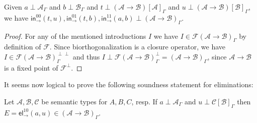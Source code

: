 \documentclass[a4paper,USenglish,cleveref, autoref, thm-restate]{lipics-v2021}
\newenvironment{caselist}{%
  \begin{list}{{\it Case}}{%
  }%
}{\end{list}%
}
\newcommand{\nextcase}{\item~}
\newcommand{\tin}{\ensuremath{\mathsf{in}}}
\newcommand{\inn}[2]{\ensuremath{\tin_{#1}^{#2}}}
\newcommand{\tel}{\mathsf{el}}
\newcommand{\el}[2]{\ensuremath{\tel_{#1}^{#2}}}
\newcommand{\contract}[1][]{\mapsto_{#1}}
\newcommand{\A}{\mathcal{A}}
\newcommand{\B}{\mathcal{B}}
\newcommand{\C}{\mathcal{C}}
\newcommand{\F}{\mathcal{F}}
\newcommand{\SN}{\mathsf{SN}}
\begin{document}
\begin{lemma}
  \label{lem:funintro}
  Given
  $a \perp \A_\Gamma$ and
  $b \perp \B_\Gamma$ and
  $t \perp (\A \to \B)[\A]_\Gamma$ and
  $u \perp (\A \to \B)[\B]_\Gamma$,
  we have
    $\inn\to{00}(t,u),
     \inn\to{01}(t,b),
     \inn\to{11}(a,b) \perp (\A \to \B)_\Gamma$.
\end{lemma}
\begin{proof}
  For any of the mentioned introductions $I$ we have
  $I \in \F(\A \to \B)_\Gamma$ by definition of $\F$.
  Since biorthogonalization is a closure operator, we have
  $I \in \F(\A \to \B)^{\perp\perp}_\Gamma$ and thus
  $I \perp \F(\A \to \B)^{\perp}_\Gamma = (\A \to \B)_\Gamma$,
  since $\A \to \B$ is a fixed point of $\F^\perp$.
\end{proof}
%
It seems now logical to prove the following soundness statement for
eliminations:
\begin{lemma}
  \label{lem:appprelim}
  Let $\A,\B,\C$ be semantic types for $A,B,C$, resp.  If
  $a \perp \A_\Gamma$ and $u \perp \C[\B]_\Gamma$ then
  $E = \el\to{10}(a,u) \in (\A \to \B)_\Gamma$.
\end{lemma}
%
%
\end{document}
